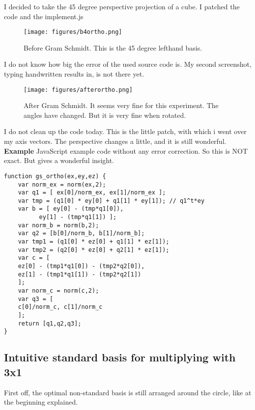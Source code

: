 \documentclass[a4paper]{article}
\begin{document}
\begin{PropositionOpt4}
I decided to take the 45 degree perspective projection of a cube. I patched the code and the implement.js\\

\begin{figure}[ht]
\texttt{[image: figures/b4ortho.png]}
\caption{Before Gram Schmidt. This is the 45 degree lefthand basis.}
\end{figure}

I do not know how big the error of the used source code is. My second screenshot, typing handwritten results in, is not there yet.\\

\begin{figure}[ht]
\texttt{[image: figures/afterortho.png]}
\caption{After Gram Schmidt. It seems very fine for this experiment. The angles have changed. But it is very fine when rotated. }
\end{figure}

I do not clean up the code today. This is the little patch, with which i went over my axis vectors. The perspective changes a little, and it is still wonderful. \\


\textbf{Example} JavaScript example code without any error correction. So this is NOT exact. But gives a wonderful insight.

\begin{lstlisting}
function gs_ortho(ex,ey,ez) {
    var norm_ex = norm(ex,2);
    var q1 = [ ex[0]/norm_ex, ex[1]/norm_ex ];
    var tmp = (q1[0] * ey[0] + q1[1] * ey[1]); // q1^t*ey
    var b = [ ey[0] - (tmp*q1[0]),
	      ey[1] - (tmp*q1[1]) ];
    var norm_b = norm(b,2);
    var q2 = [b[0]/norm_b, b[1]/norm_b];
    var tmp1 = (q1[0] * ez[0] + q1[1] * ez[1]);
    var tmp2 = (q2[0] * ez[0] + q2[1] * ez[1]);
    var c = [
	ez[0] - (tmp1*q1[0]) - (tmp2*q2[0]),
	ez[1] - (tmp1*q1[1]) - (tmp2*q2[1])
    ];
    var norm_c = norm(c,2);
    var q3 = [
	c[0]/norm_c, c[1]/norm_c
    ];
    return [q1,q2,q3];
}
\end{lstlisting}



\subsection{Intuitive standard basis for multiplying with 3x1}
\label{intuitive_standard_basis}
First off, the optimal non-standard basis is still arranged around the circle, like at the beginning explained.\\


\end{PropositionOpt4}
\end{document}
